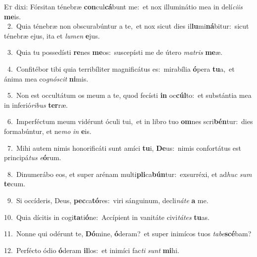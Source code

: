 \lettrine{\initial\textcolor{\initialcolor}{E}}{t} dixi: Fórsitan ténebræ \textbf{con}\-cul\-\textbf{cá}\-bunt me:~\star et nox illuminátio mea in delí\-\textit{ci}\-\textit{is} \textbf{me}\-is.\\
{\numbfont\textcolor{\numbcolor}{~2.}}~Quia ténebræ non obscurabúntur a te,~\dagger et nox sicut dies il\-\textbf{lu}\-mi\-\textbf{ná}\-bitur:~\star sicut ténebræ ejus, ita et \textit{lu}\-\textit{men} \textbf{e}\-jus.\par
{\numbfont\textcolor{\numbcolor}{~3.}}~Quia tu possedísti \textbf{re}\-nes \textbf{me}\-os:~\star suscepísti me de útero \textit{ma}\-\textit{tris} \textbf{me}\-æ.\par
{\numbfont\textcolor{\numbcolor}{~4.}}~Confitébor tibi quia terribíliter magnificátus es:~\dagger mirabília \textbf{ó}\-pera \textbf{tu}\-a,~\star et ánima mea co\-\textit{gnó}\-\textit{scit} \textbf{ni}\-mis.\par
{\numbfont\textcolor{\numbcolor}{~5.}}~Non est occultátum os meum a te, quod fecísti \textbf{in} oc\-\textbf{cúl}\-to:~\star et substántia mea in inferió\-\textit{ri}\-\textit{bus} \textbf{ter}\-ræ.\par
{\numbfont\textcolor{\numbcolor}{~6.}}~Imperféctum meum vidérunt óculi tui,~\dagger et in libro tuo \textbf{om}\-nes scri\-\textbf{bén}\-tur:~\star dies formabúntur, et ne\textit{mo} \textit{in} \textbf{e}\-is.\par
{\numbfont\textcolor{\numbcolor}{~7.}}~Mihi autem nimis honorificáti sunt amíci \textbf{tu}\-i, \textbf{De}\-us:~\star nimis confortátus est principá\textit{tus} \textit{e}\-\textbf{ó}rum.\par
{\numbfont\textcolor{\numbcolor}{~8.}}~Dinumerábo eos, et super arénam multi\-\textbf{pli}\-ca\-\textbf{bún}\-tur:~\star exsurréxi, et ad\textit{huc} \textit{sum} \textbf{te}\-cum.\par
{\numbfont\textcolor{\numbcolor}{~9.}}~Si occíderis, Deus, \textbf{pec}\-ca\-\textbf{tó}\-res:~\star viri sánguinum, decli\-\textit{ná}\-\textit{te} \textbf{a} me.\par
{\numbfont\textcolor{\numbcolor}{10.}}~Quia dícitis in cogi\-\textbf{ta}\-ti\-\textbf{ó}\-ne:~\star Accípient in vanitáte civi\-\textit{tá}\-\textit{tes} \textbf{tu}\-as.\par
{\numbfont\textcolor{\numbcolor}{11.}}~Nonne qui odérunt te, \textbf{Dó}\-mine, \textbf{ó}\-deram?~\star et super inimícos tuos \textit{ta}\-\textit{be}\textbf{scé}bam?\par
{\numbfont\textcolor{\numbcolor}{12.}}~Perfécto ódio \textbf{ó}\-deram \textbf{il}\-los:~\star et inimíci fac\textit{ti} \textit{sunt} \textbf{mi}\-hi.\par
